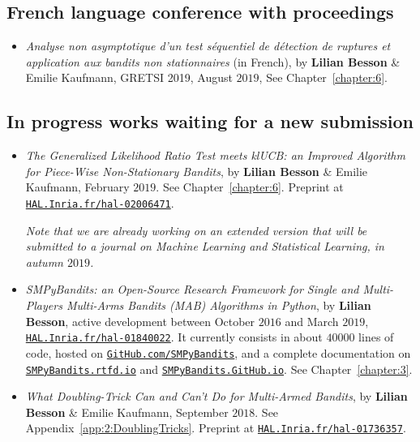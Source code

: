 \subsection*{French language conference with proceedings}

\begin{itemize}
\item
    \emph{Analyse non asymptotique d'un test séquentiel de détection de ruptures et application aux bandits non stationnaires} (in French),
    by \textbf{Lilian Besson} \& Emilie Kaufmann,
    GRETSI 2019,
    August $2019$,
    See Chapter~\ref{chapter:6}.
    \cite{Besson2019Gretsi}

\end{itemize}


\subsection*{In progress works waiting for a new submission}

\begin{itemize}

\item
    \emph{The Generalized Likelihood Ratio Test meets klUCB: an Improved Algorithm for Piece-Wise Non-Stationary Bandits},
    by \textbf{Lilian Besson} \& Emilie Kaufmann,
    February $2019$.
    See Chapter~\ref{chapter:6}.
    Preprint at \href{https://HAL.Inria.fr/hal-02006471}{\texttt{HAL.Inria.fr/hal-02006471}}.
    \cite{Besson2019GLRT}

    \emph{Note that we are already working on an extended version that will be submitted to a journal on Machine Learning and Statistical Learning, in autumn $2019$.}

\item
    \emph{SMPyBandits: an Open-Source Research Framework for Single and Multi-Players Multi-Arms Bandits (MAB) Algorithms in Python},
    by \textbf{Lilian Besson}, active development between October $2016$ and March $2019$,
    \href{https://HAL.Inria.fr/hal-01840022}{\texttt{HAL.Inria.fr/hal-01840022}}.
    It currently consists in about $40000$ lines of code, hosted on \href{https://GitHub.com/SMPyBandits}{\texttt{GitHub.com/SMPyBandits}},
    and a complete documentation on \href{https://SMPyBandits.rtfd.io}{\texttt{SMPyBandits.rtfd.io}} and \href{https://SMPyBandits.GitHub.io}{\texttt{SMPyBandits.GitHub.io}}.
    See Chapter~\ref{chapter:3}.
    \cite{SMPyBandits,SMPyBanditsJMLR}

\item
    \emph{What Doubling-Trick Can and Can't Do for Multi-Armed Bandits},
    by \textbf{Lilian Besson} \& Emilie Kaufmann,
    September $2018$.
    See Appendix~\ref{app:2:DoublingTricks}.
    Preprint at \href{https://HAL.Inria.fr/hal-01736357}{\texttt{HAL.Inria.fr/hal-01736357}}.
    \cite{Besson2018DoublingTricks}

\end{itemize}


